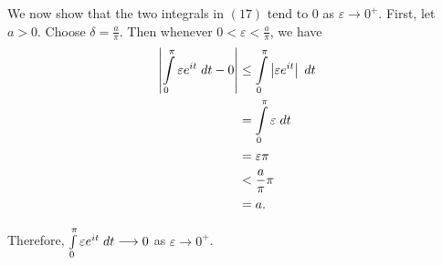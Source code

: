 \documentclass{article}
\begin{document}
\noindent We now show that the two integrals in $(17)$ tend to $0$ as $\varepsilon \rightarrow 0^{+}$.  First, let $a>0$.  Choose $\delta = \frac{a}{\pi}$.  Then whenever $0<\varepsilon<\frac{a}{\pi}$, we have
\begin{align}
\left| \int\limits_0^\pi \varepsilon e^{it} \hspace{1mm} dt - 0\right| &\leq \int\limits_0^\pi \left| \varepsilon e^{it} \right| \hspace{1mm} dt \\
&= \int\limits_0^\pi\varepsilon \hspace{1mm} dt \\
&= \varepsilon \pi \\
&<\frac{a}{\pi} \pi \\
&= a.
\end{align}

\noindent Therefore, $\int\limits_0^\pi \varepsilon e^{it} \hspace{1mm} dt \longrightarrow 0$ as $\varepsilon \rightarrow 0^+$.   
\end{document}
